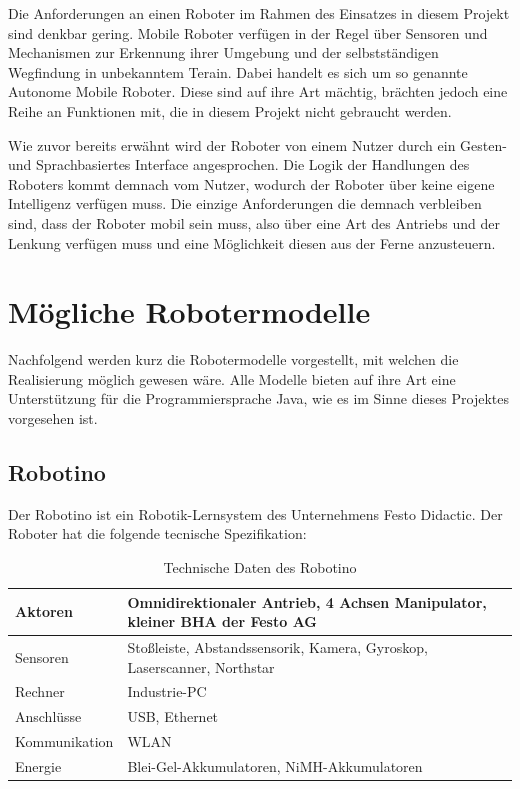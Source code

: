 Die Anforderungen an einen Roboter im Rahmen des Einsatzes in diesem Projekt sind denkbar gering. Mobile Roboter verf\"ugen in der Regel \"uber Sensoren und Mechanismen zur Erkennung ihrer Umgebung und der selbstst\"andigen Wegfindung in unbekanntem Terain. Dabei handelt es sich um so genannte Autonome Mobile Roboter. Diese sind auf ihre Art m\"achtig, br\"achten jedoch eine Reihe an Funktionen mit, die in diesem Projekt nicht gebraucht werden.
\par\smallskip
Wie zuvor bereits erw\"ahnt wird der Roboter von einem Nutzer durch ein Gesten- und Sprachbasiertes Interface angesprochen. Die Logik der Handlungen des Roboters kommt demnach vom Nutzer, wodurch der Roboter \"uber keine eigene Intelligenz verf\"ugen muss. Die einzige Anforderungen die demnach verbleiben sind, dass der Roboter mobil sein muss, also \"uber eine Art des Antriebs und der Lenkung verf\"ugen muss und eine M\"oglichkeit diesen aus der Ferne anzusteuern.

\section{M\"ogliche Robotermodelle}
\label{chap:RoboterModelle}

Nachfolgend werden kurz die Robotermodelle vorgestellt, mit welchen die Realisierung m\"oglich gewesen w\"are. Alle Modelle bieten auf ihre Art eine Unterst\"utzung f\"ur die Programmiersprache Java, wie es im Sinne dieses Projektes vorgesehen ist.

\subsection{Robotino}

Der Robotino ist ein Robotik-Lernsystem des Unternehmens Festo Didactic\footnotemark[11] .
Der Roboter hat die folgende tecnische Spezifikation\footnotemark[12] :


\begin{table}[H]
\label{tab:Tech_Robotino}
\caption[Technische Daten des Robotino]{ Technische Daten des Robotino}
\begin{tabular}{|p{5.7cm}|p{9cm}|}
\hline
Aktoren	& Omnidirektionaler Antrieb, 4 Achsen Manipulator, kleiner BHA der Festo AG \\
\hline
Sensoren & Stoßleiste, Abstandssensorik, Kamera, Gyroskop, Laserscanner, Northstar \\
\hline
Rechner	& Industrie-PC \\
\hline
Anschlüsse	& USB, Ethernet \\
\hline
Kommunikation & WLAN \\
\hline
Energie	& Blei-Gel-Akkumulatoren, NiMH-Akkumulatoren \\
\hline
\end{tabular}
\end{table}
\clearpage

